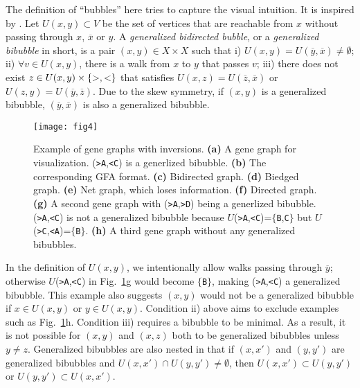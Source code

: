 \documentclass[webpdf,contemporary,large,namedate]{oup-authoring-template}%
\begin{document}
The definition of ``bubbles'' here tries to capture the visual intuition.
It is inspired by \citet{DBLP:conf/wabi/OnoderaSS13}.
Let $U(x,y)\subset V$ be the set of vertices that are reachable from $x$ without passing through $x$, $\overline{x}$ or $y$.
A \emph{generalized bidirected bubble}, or a \emph{generalized bibubble} in short, is a pair $(x,y)\in X\times X$ such that
i) $U(x,y)=U(\overline{y},\overline{x})\not=\emptyset$;
ii) $\forall v\in U(x,y)$, there is a walk from $x$ to $y$ that passes $v$;
iii) there does not exist $z\in U(x,y)\times\{{\rm >},{\rm <}\}$
that satisfies $U(x,z)=U(\overline{z},\overline{x})$ or $U(z,y)=U(\overline{y},\overline{z})$.
Due to the skew symmetry, if $(x,y)$ is a generalized bibubble, $(\overline{y},\overline{x})$ is also a generalized bibubble.

\begin{figure}[t!]
\centering
\texttt{[image: fig4]}
\caption{Example of gene graphs with inversions.
{\bf (a)} A gene graph for visualization. ({\tt >A},{\tt <C}) is a generlized bibubble.
{\bf (b)} The corresponding GFA format.
{\bf (c)} Bidirected graph.
{\bf (d)} Biedged graph.
{\bf (e)} Net graph, which loses information.
{\bf (f)} Directed graph.
{\bf (g)} A second gene graph with ({\tt >A},{\tt >D}) being a generlized bibubble.
({\tt >A},{\tt <C}) is not a generalized bibubble because $U$({\tt >A},{\tt <C})=$\{${\tt B},{\tt C}$\}$
but $U$({\tt >C},{\tt <A})=$\{${\tt B}$\}$.
{\bf (h)} A third gene graph without any generalized bibubbles.
}\label{fig:inv}
\end{figure}

In the definition of $U(x,y)$, we intentionally allow walks passing through $\overline{y}$;
otherwise $U$({\tt >A},{\tt <C}) in Fig.~\ref{fig:inv}g would become $\{${\tt B}$\}$, making ({\tt >A},{\tt <C}) a generalized bibubble.
This example also suggests $(x,y)$ would not be a generalized bibubble if $x\in U(x,y)$ or $y\in U(x,y)$.
Condition ii) above aims to exclude examples such as Fig.~\ref{fig:inv}h.
Condition iii) requires a bibubble to be minimal.
As a result, it is not possible for $(x,y)$ and $(x,z)$ both to be generalized bibubbles unless $y\not=z$.
Generalized bibubbles are also nested in that
if $(x,x')$ and $(y,y')$ are generalized bibubbles and $U(x,x')\cap U(y,y')\not=\emptyset$,
then $U(x,x')\subset U(y,y')$ or $U(y,y')\subset U(x,x')$.

\end{document}
